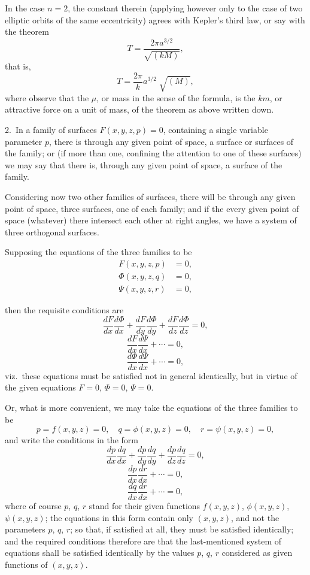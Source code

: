 \documentclass[11pt,a4paper]{article}
\theoremstyle{plain}
\theoremstyle{definition}
\begin{document}
In the case $n = 2$, the constant therein (applying however only to the case of two
elliptic orbits of the same eccentricity) agrees with Kepler's third law, or say with
the theorem
\[
T = \frac{2\pi a^{3/2}}{\sqrt{(kM)}},
\]
that is,
\[
T = \frac{2\pi}{k}a^{3/2}\;\sqrt{(M)},
\]
where observe that the $\mu$, or mass in the sense of the formula, is the $km$, or
attractive force on a unit of mass, of the theorem as above written down.

2.\ In a family of surfaces $F(x, y, z, p) = 0$, containing a single variable parameter $p$,
there is through any given point of space, a surface or surfaces of the family; or (if
more than one, confining the attention to one of these surfaces) we may say that
there is, through any given point of space, a surface of the family.

Considering now two other families of surfaces, there will be through any given
point of space, three surfaces, one of each family; and if the every given point of
space (whatever) there intersect each other at right angles, we have a system of three
orthogonal surfaces.

Supposing the equations of the three families to be
\begin{align*}
F(x, y, z, p) &= 0, \\
\Phi(x, y, z, q) &= 0, \\
\Psi(x, y, z, r) &= 0,
\end{align*}

\clearpage

\noindent
then the requisite conditions are
\[
\frac{dF}{dx}\frac{d\Phi}{dx} + \frac{dF}{dy}\frac{d\Phi}{dy} + \frac{dF}{dz}\frac{d\Phi}{dz} = 0,
\]
\[
\frac{dF}{dx}\frac{d\Psi}{dx} + \cdots = 0,
\]
\[
\frac{d\Phi}{dx}\frac{d\Psi}{dx} + \cdots = 0,
\]
viz.\ these equations must be satisfied not in general identically, but in virtue of the
given equations $F = 0$, $\Phi = 0$, $\Psi = 0$.

Or, what is more convenient, we may take the equations of the three families
to be
\[
p = f(x, y, z) = 0, \quad q = \phi(x, y, z) = 0, \quad r = \psi(x, y, z) = 0,
\]
and write the conditions in the form
\[
\frac{dp}{dx}\frac{dq}{dx} + \frac{dp}{dy}\frac{dq}{dy} + \frac{dp}{dz}\frac{dq}{dz} = 0,
\]
\[
\frac{dp}{dx}\frac{dr}{dx} + \cdots = 0,
\]
\[
\frac{dq}{dx}\frac{dr}{dx} + \cdots = 0,
\]
where of course $p$, $q$, $r$ stand for their given functions $f(x, y, z)$, $\phi(x, y, z)$, $\psi(x, y, z)$; the
equations in this form contain only $(x, y, z)$, and not the parameters $p$, $q$, $r$; so that,
if satisfied at all, they must be satisfied identically; and the required conditions therefore
are that the last-mentioned system of equations shall be satisfied identically by the
values $p$, $q$, $r$ considered as given functions of $(x, y, z)$.
\end{document}
